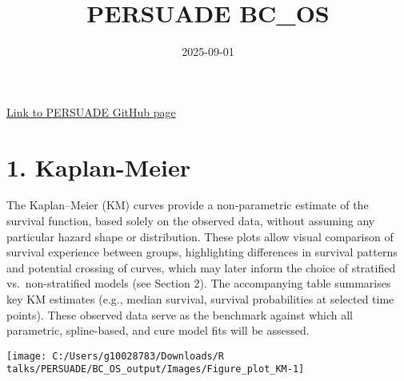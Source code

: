 \documentclass[
]{article}
\title{PERSUADE BC\_OS}
\author{}
\date{\vspace{-2.5em}2025-09-01}
\begin{document}
\maketitle

{
\hypersetup{linkcolor=}
\setcounter{tocdepth}{2}
\tableofcontents
}
\hfill\break

\href{https://github.com/Bram-R/PERSUADE}{Link to PERSUADE GitHub page}

\clearpage

\section{1. Kaplan-Meier}\label{kaplan-meier}

The Kaplan--Meier (KM) curves provide a non-parametric estimate of the
survival function, based solely on the observed data, without assuming
any particular hazard shape or distribution. These plots allow visual
comparison of survival experience between groups, highlighting
differences in survival patterns and potential crossing of curves, which
may later inform the choice of stratified vs.~non-stratified models (see
Section 2). The accompanying table summarises key KM estimates (e.g.,
median survival, survival probabilities at selected time points). These
observed data serve as the benchmark against which all parametric,
spline-based, and cure model fits will be assessed.

\clearpage

\begin{flushleft}\texttt{[image: C:/Users/g10028783/Downloads/R talks/PERSUADE/BC\_OS\_output/Images/Figure\_plot\_KM-1]} \end{flushleft}

\begin{table}[H]
\centering
\caption{\label{tab:Table_1}Observed survival data}
\centering
{}
\end{table}
\end{document}
